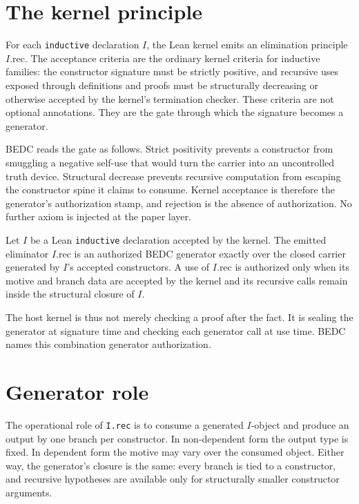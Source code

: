 \section{The kernel principle}
\label{sec:recursor-generator-kernel-principle}

For each \texttt{inductive} declaration $I$, the Lean kernel emits an elimination principle $I.\text{rec}$. The acceptance criteria are the ordinary kernel criteria for inductive families: the constructor signature must be strictly positive, and recursive uses exposed through definitions and proofs must be structurally decreasing or otherwise accepted by the kernel's termination checker. These criteria are not optional annotations. They are the gate through which the signature becomes a generator.

BEDC reads the gate as follows. Strict positivity prevents a constructor from smuggling a negative self-use that would turn the carrier into an uncontrolled truth device. Structural decrease prevents recursive computation from escaping the constructor spine it claims to consume. Kernel acceptance is therefore the generator's authorization stamp, and rejection is the absence of authorization. No further axiom is injected at the paper layer.

\begin{principle}
\label{prin:recursor-authorization}
Let $I$ be a Lean \texttt{inductive} declaration accepted by the kernel. The emitted eliminator $I.\text{rec}$ is an authorized BEDC generator exactly over the closed carrier generated by $I$'s accepted constructors. A use of $I.\text{rec}$ is authorized only when its motive and branch data are accepted by the kernel and its recursive calls remain inside the structural closure of $I$.
\end{principle}

The host kernel is thus not merely checking a proof after the fact. It is sealing the generator at signature time and checking each generator call at use time. BEDC names this combination generator authorization.

\section{Generator role}
\label{sec:recursor-generator-role}

The operational role of \texttt{I.rec} is to consume a generated $I$-object and produce an output by one branch per constructor. In non-dependent form the output type is fixed. In dependent form the motive may vary over the consumed object. Either way, the generator's closure is the same: every branch is tied to a constructor, and recursive hypotheses are available only for structurally smaller constructor arguments.


